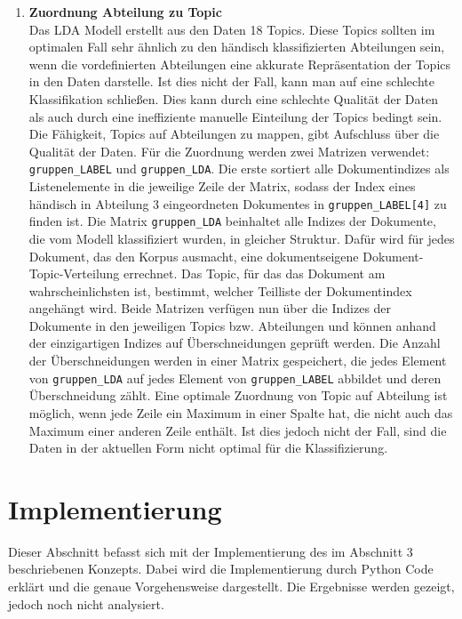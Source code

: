\documentclass[german,version-2020-11]{uzl-thesis}
\begin{document}
\begin{itemize}
\begin{enumerate}
\item \textbf{Zuordnung Abteilung zu Topic}\\
Das LDA Modell erstellt aus den Daten 18 Topics. Diese Topics sollten im optimalen Fall sehr ähnlich zu den händisch klassifizierten Abteilungen sein, wenn die vordefinierten Abteilungen eine akkurate Repräsentation der Topics in den Daten darstelle. Ist dies nicht der Fall, kann man auf eine schlechte Klassifikation schließen. Dies kann durch eine schlechte Qualität der Daten als auch durch eine ineffiziente manuelle Einteilung der Topics bedingt sein. Die Fähigkeit, Topics auf Abteilungen zu mappen, gibt Aufschluss über die Qualität der Daten. Für die Zuordnung werden zwei Matrizen verwendet: \lstinline{gruppen_LABEL} und \lstinline{gruppen_LDA}. Die erste sortiert alle Dokumentindizes als Listenelemente in die jeweilige Zeile der Matrix, sodass der Index eines händisch in Abteilung 3 eingeordneten Dokumentes in \lstinline{gruppen_LABEL[4]} zu finden ist. Die Matrix \lstinline{gruppen_LDA} beinhaltet alle Indizes der Dokumente, die vom Modell klassifiziert wurden, in gleicher Struktur. Dafür wird für jedes Dokument, das den Korpus ausmacht, eine dokumentseigene Dokument-Topic-Verteilung errechnet. Das Topic, für das das Dokument am wahrscheinlichsten ist, bestimmt, welcher Teilliste der Dokumentindex angehängt wird. Beide Matrizen verfügen nun über die Indizes der Dokumente in den jeweiligen Topics bzw. Abteilungen und können anhand der einzigartigen Indizes auf Überschneidungen geprüft werden. Die Anzahl der Überschneidungen werden in einer Matrix gespeichert, die jedes Element von \lstinline{gruppen_LDA} auf jedes Element von \lstinline{gruppen_LABEL} abbildet und deren Überschneidung zählt. Eine optimale Zuordnung von Topic auf Abteilung ist möglich, wenn jede Zeile ein Maximum in einer Spalte hat, die nicht auch das Maximum einer anderen Zeile enthält. Ist dies jedoch nicht der Fall, sind die Daten in der aktuellen Form nicht optimal für die Klassifizierung. 
\end{enumerate}


\chapter{Implementierung}%
Dieser Abschnitt befasst sich mit der Implementierung des im Abschnitt 3 beschriebenen Konzepts. Dabei wird die Implementierung durch Python Code erklärt und die genaue Vorgehensweise dargestellt. Die Ergebnisse werden gezeigt, jedoch noch nicht analysiert. \\

\end{itemize}
\end{document}
